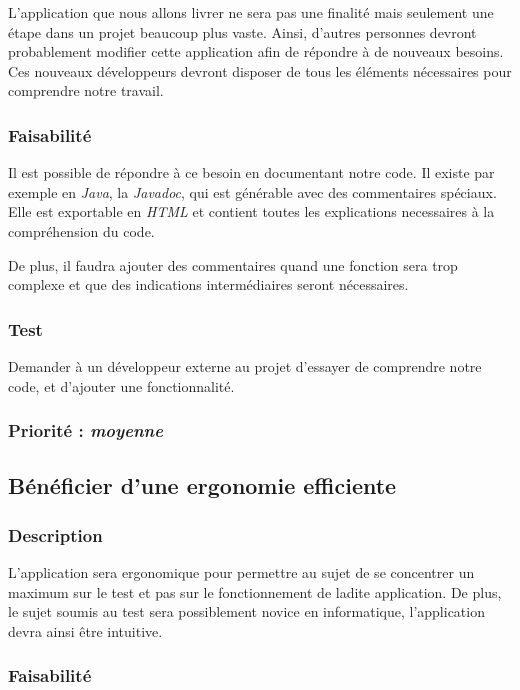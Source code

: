 L’application que nous allons livrer ne sera pas une finalité mais seulement une étape dans un projet beaucoup plus vaste. Ainsi, d’autres personnes devront probablement modifier cette application afin de répondre à de nouveaux besoins. Ces nouveaux développeurs devront disposer de tous les éléments nécessaires pour comprendre notre travail. 

\subsubsection{Faisabilité}

Il est possible de répondre à ce besoin en documentant notre code. Il existe par exemple en \textit{Java}, la \textit{Javadoc}, qui est générable avec des commentaires spéciaux. Elle est exportable en \textit{HTML} et contient toutes les explications necessaires à la compréhension du code. 

De plus, il faudra ajouter des commentaires quand une fonction sera trop complexe et que des indications intermédiaires seront nécessaires.

\subsubsection{Test}

Demander à un développeur externe au projet d’essayer de comprendre notre code, et d'ajouter une fonctionnalité.

\subsubsection{Priorité : \textit{moyenne}}

\subsection{Bénéficier d’une ergonomie efficiente}

\subsubsection{Description}

L’application sera ergonomique pour permettre au sujet de se concentrer un maximum sur le test et pas sur le fonctionnement de ladite application. De plus, le sujet soumis au test sera possiblement novice en informatique, l’application devra ainsi être intuitive.

\subsubsection{Faisabilité}

